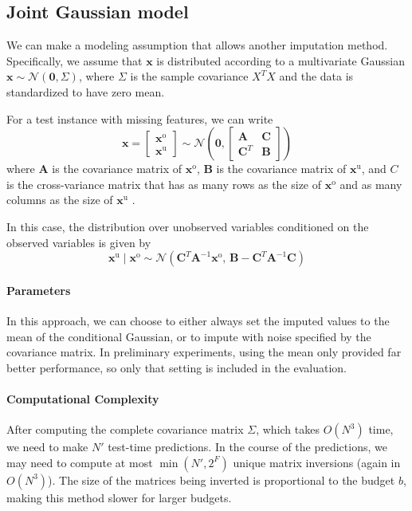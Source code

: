 \subsection{Joint Gaussian model}

We can make a modeling assumption that allows another imputation method.
Specifically, we assume that $\mathbf{x}$ is distributed according to a multivariate Gaussian $\mathbf{x} \sim \mathcal{N}(\mathbf{0}, \Sigma)$, where $\Sigma$ is the sample covariance $X^T X$ and the data is standardized to have zero mean.

For a test instance with missing features, we can write
\begin{equation}
\mathbf{x} = \begin{bmatrix} \mathbf{x}^\text{o}\\  \mathbf{x}^\text{u} \end{bmatrix} \sim \mathcal{N} \left( \mathbf{0}, \begin{bmatrix} \mathbf{A} & \mathbf{C}\\ \mathbf{C}^T & \mathbf{B} \end{bmatrix} \right)
\end{equation}
where $\mathbf{A}$ is the covariance matrix of $\mathbf{x}^\text{o}$, $\mathbf{B}$ is the covariance matrix of $\mathbf{x}^\text{u}$, and $C$ is the cross-variance matrix that has as many rows as the size of $\mathbf{x}^\text{o}$ and as many columns as the size of $\mathbf{x}^\text{u}$ \cite{Roweis-gaussian-identities}.

In this case, the distribution over unobserved variables conditioned on the observed variables is given by 
\begin{equation}
\mathbf{x}^\text{u} \mid \mathbf{x}^\text{o} \sim \mathcal{N} \left( \mathbf{C}^T \mathbf{A}^{-1} \mathbf{x}^\text{o},\, \mathbf{B} - \mathbf{C}^T \mathbf{A}^{-1} \mathbf{C} \right)
\end{equation}

\paragraph{Parameters}
In this approach, we can choose to either always set the imputed values to the mean of the conditional Gaussian, or to impute with noise specified by the covariance matrix.
In preliminary experiments, using the mean only provided far better performance, so only that setting is included in the evaluation.

\paragraph{Computational Complexity}
After computing the complete covariance matrix $\Sigma$, which takes $O(N^3)$ time, we need to make $N'$ test-time predictions.
In the course of the predictions, we may need to compute at most $\min(N', 2^F)$ unique matrix inversions (again in $O(N^3)$).
The size of the matrices being inverted is proportional to the budget $b$, making this method slower for larger budgets.

